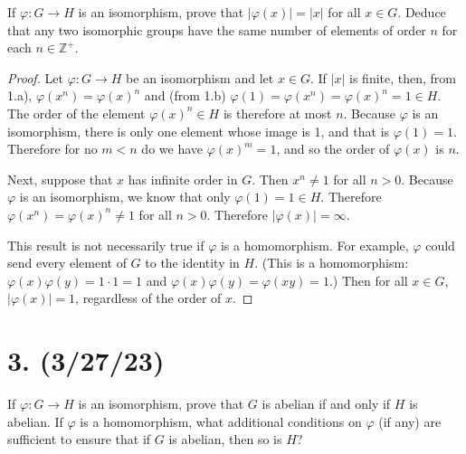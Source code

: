 \documentclass{article}
\begin{document}
If $\varphi: G \rightarrow H$ is an isomorphism, prove that $|\varphi(x)| = |x|$ for all $x \in G$. Deduce that any two isomorphic groups have the same number of elements of order $n$ for each $n \in \mathbb{Z}^+$.

\begin{proof}
    Let $\varphi: G \rightarrow H$ be an isomorphism and let $x \in G$. If $|x|$ is finite, then, from 1.a), $\varphi(x^n) = \varphi(x)^n$ and (from 1.b) $\varphi(1) = \varphi(x^n) = \varphi(x)^n = 1 \in H$. The order of the element $\varphi(x)^n \in H$ is therefore at most $n$. Because $\varphi$ is an isomorphism, there is only one element whose image is 1, and that is $\varphi(1) = 1$. Therefore for no $m < n$ do we have $\varphi(x)^m = 1$, and so the order of $\varphi(x)$ is $n$.

    Next, suppose that $x$ has infinite order in $G$. Then $x^n \neq 1$ for all $n > 0$. Because $\varphi$ is an isomorphism, we know that only $\varphi(1) = 1 \in H$. Therefore $\varphi(x^n) = \varphi(x)^n \neq 1$ for all $n > 0$. Therefore $|\varphi(x)| = \infty$.

    This result is not necessarily true if $\varphi$ is a homomorphism. For example, $\varphi$ could send every element of $G$ to the identity in $H$. (This is a homomorphism: $\varphi(x)\varphi(y) = 1 \cdot 1 = 1$ and $\varphi(x)\varphi(y) = \varphi(xy) = 1$.) Then for all $x \in G$, $|\varphi(x)| = 1$, regardless of the order of $x$.
\end{proof}

\section*{3. (3/27/23)}

If $\varphi: G \rightarrow H$ is an isomorphism, prove that $G$ is abelian if and only if $H$ is abelian. If $\varphi$ is a homomorphism, what additional conditions on $\varphi$ (if any) are sufficient to ensure that if $G$ is abelian, then so is $H$?
\end{document}
